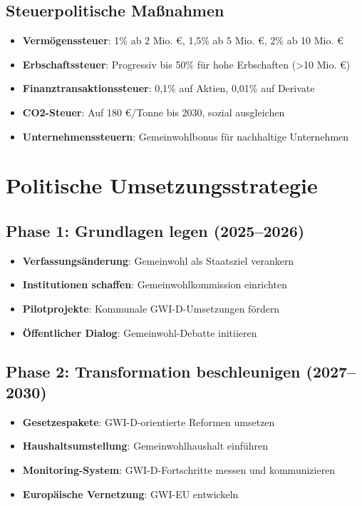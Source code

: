 \subsection{Steuerpolitische Maßnahmen}

\begin{itemize}
    \item \textbf{Vermögenssteuer}: 1\% ab 2 Mio. €, 1,5\% ab 5 Mio. €, 2\% ab 10 Mio. €
    \item \textbf{Erbschaftssteuer}: Progressiv bis 50\% für hohe Erbschaften (>10 Mio. €)
    \item \textbf{Finanztransaktionssteuer}: 0,1\% auf Aktien, 0,01\% auf Derivate
    \item \textbf{CO2-Steuer}: Auf 180 €/Tonne bis 2030, sozial ausgleichen
    \item \textbf{Unternehmenssteuern}: Gemeinwohlbonus für nachhaltige Unternehmen
\end{itemize}

\section{Politische Umsetzungsstrategie}

\subsection{Phase 1: Grundlagen legen (2025–2026)}

\begin{itemize}
    \item \textbf{Verfassungsänderung}: Gemeinwohl als Staatsziel verankern
    \item \textbf{Institutionen schaffen}: Gemeinwohlkommission einrichten
    \item \textbf{Pilotprojekte}: Kommunale GWI-D-Umsetzungen fördern
    \item \textbf{Öffentlicher Dialog}: Gemeinwohl-Debatte initiieren
\end{itemize}

\subsection{Phase 2: Transformation beschleunigen (2027–2030)}

\begin{itemize}
    \item \textbf{Gesetzespakete}: GWI-D-orientierte Reformen umsetzen
    \item \textbf{Haushaltsumstellung}: Gemeinwohlhaushalt einführen
    \item \textbf{Monitoring-System}: GWI-D-Fortschritte messen und kommunizieren
    \item \textbf{Europäische Vernetzung}: GWI-EU entwickeln
\end{itemize}


